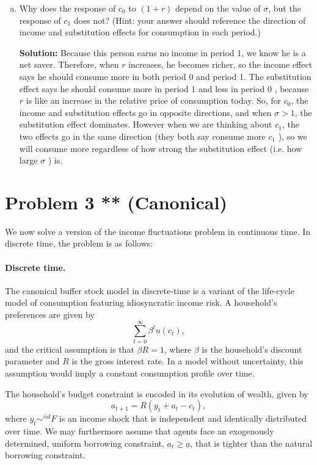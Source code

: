 \documentclass[11pt]{extarticle}
\theoremstyle{plain}
\theoremstyle{definition}
\begin{document}
\begin{enumerate}[(a)]
\item  Why does the response of $c_0$ to $(1+r)$ depend on the value of $\sigma$, but the response of $c_1$ does not? (Hint: your answer should reference the direction of income and substitution effects for consumption in each period.)

\textbf{Solution:} Because this person earns no income in period 1, we know he is a net saver. Therefore, when $r$ increases, he becomes richer, so the income effect says he should consume more in both period 0 and period 1.
The substitution effect says he should consume more in period 1 and less in period 0 , because $r$ is like an increase in the relative price of consumption today.
So, for $c_0$, the income and substitution effects go in opposite directions, and when $\sigma>1$, the substitution effect dominates. However when we are thinking about $c_1$, the two effects go in the same direction (they both say consume more $c_1$ ), so we will consume more regardless of how strong the substitution effect (i.e. how large $\sigma$ ) is.

\end{enumerate}

\vspace{10mm}
\section*{Problem 3 ** (Canonical)}

We now solve a version of the income fluctuations problem in continuous time. In discrete time, the problem is as follows:


\paragraph{Discrete time.} The canonical buffer stock model in discrete-time is a variant of the life-cycle model of consumption featuring idiosyncratic income risk. A household's preferences are given by 
\begin{equation}
	\sum_{t=0}^\infty \beta^t u(c_t),
\end{equation}
and the critical assumption is that $\beta R = 1$, where $\beta$ is the household's discount parameter and $R$ is the gross interest rate. In a model without uncertainty, this assumption would imply a constant consumption profile over time.

The household's budget constraint is encoded in its evolution of wealth, given by 
\begin{equation}
	a_{t+1} = R(y_t + a_t - c_t),
\end{equation}
where $y_t \sim^{iid} F$ is an income shock that is independent and identically distributed over time. We may furthermore assume that agents face an exogenously determined, uniform borrowing constraint, $a_t \geq \underline{a}$, that is tighter than the natural borrowing constraint. 
\end{document}
